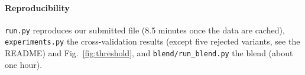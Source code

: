 \documentclass[10pt,conference,compsocconf]{IEEEtran}
\begin{document}
\paragraph{Reproducibility}
\texttt{run.py} reproduces our submitted file (8.5 minutes once the data are
cached), \texttt{experiments.py} the cross-validation results (except five rejected
variants, see the README) and Fig.~\ref{fig:threshold}, and
\texttt{blend/run\_blend.py} the blend (about one hour).



\end{document}
